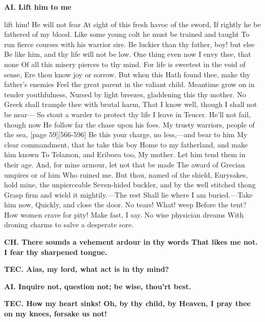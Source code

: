 \documentclass[11pt,letter]{book}
\begin{document}
\par \textbf{AI. Lift him to me}
\par   lift him! He will not fear At sight of this fresh havoc of the sword, If rightly he be fathered of my blood. Like some young colt he must be trained and taught To run fierce courses with his warrior sire. Be luckier than thy father, boy! but else Be like him, and thy life will not be low. One thing even now I envy thee, that none Of all this misery pierces to thy mind. For life is sweetest in the void of sense, Ere thou know joy or sorrow. But when this Hath found thee, make thy father’s enemies Feel the great parent in the valiant child. Meantime grow on in tender youthfulness, Nursed by light breezes, gladdening this thy mother. No Greek shall trample thee with brutal harm, That I know well, though I shall not be near— So stout a warder to protect thy life I leave in Teucer. He’ll not fail, though now He follow far the chase upon his foes. My trusty warriors, people of the sea, [page 59][566-596] Be this your charge, no less,—and bear to him My clear commandment, that he take this boy Home to my fatherland, and make him known To Telamon, and Eriboea too, My mother. Let him tend them in their age. And, for mine armour, let not that be made The award of Grecian umpires or of him Who ruined me. But thou, named of the shield, Eurysakes, hold mine, the unpierceable Seven-hided buckler, and by the well stitched thong Grasp firm and wield it mightily.—The rest Shall lie where I am buried.—Take him now, Quickly, and close the door. No tears! What! weep Before the tent? How women crave for pity! Make fast, I say. No wise physician dreams With droning charms to salve a desperate sore.

\par \textbf{CH. There sounds a vehement ardour in thy words That likes me not. I fear thy sharpened tongue.}
\par 

\par \textbf{TEC. Aias, my lord, what act is in thy mind?}
\par 

\par \textbf{AI. Inquire not, question not; be wise, thou’rt best.}
\par 

\par \textbf{TEC. How my heart sinks! Oh, by thy child, by Heaven, I pray thee on my knees, forsake us not!}
\par 
\end{document}

